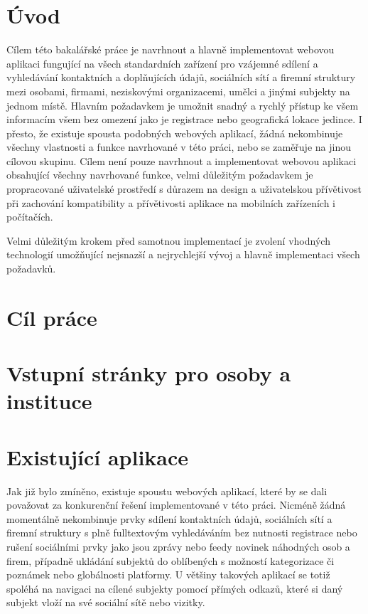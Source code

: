 \section{Úvod}


Cílem této bakalářské práce je navrhnout a hlavně implementovat webovou aplikaci fungující na všech standardních zařízení
pro vzájemné sdílení a vyhledávání kontaktních a doplňujících údajů, sociálních sítí a firemní struktury mezi osobami, firmami,
neziskovými organizacemi, umělci a jinými subjekty na jednom místě.
Hlavním požadavkem je umožnit snadný a rychlý přístup ke všem informacím všem bez omezení jako je registrace nebo
geografická lokace jedince.
I přesto, že existuje spousta podobných webových aplikací, žádná nekombinuje všechny vlastnosti a funkce navrhované
v této práci, nebo se zaměřuje na jinou cílovou skupinu.
Cílem není pouze navrhnout a implementovat webovou aplikaci obsahující všechny navrhované funkce, velmi důležitým
požadavkem je propracované uživatelské prostředí s důrazem na design a uživatelskou přívětivost při zachování kompatibility
a přívětivosti aplikace na mobilních zařízeních i počítačích.


Velmi důležitým krokem před samotnou implementací je zvolení vhodných technologií umožňující nejsnazší a nejrychlejší
vývoj a hlavně implementaci všech požadavků.

\section{Cíl práce}


\section{Vstupní stránky pro osoby a instituce}


\section{Existující aplikace}

Jak již bylo zmíněno, existuje spoustu webových aplikací, které by se dali považovat za konkurenční řešení implementované
v této práci.
Nicméně žádná momentálně nekombinuje prvky sdílení kontaktních údajů, sociálních sítí a firemní struktury s plně
fulltextovým vyhledáváním bez nutnosti registrace nebo rušení sociálními prvky jako jsou zprávy nebo feedy novinek
náhodných osob a firem, případně ukládání subjektů do oblíbených s možností kategorizace či poznámek nebo globálnosti
platformy.
U většiny takových aplikací se totiž spoléhá na navigaci na cílené subjekty pomocí přímých odkazů, které si daný subjekt
vloží na své sociální sítě nebo vizitky.

